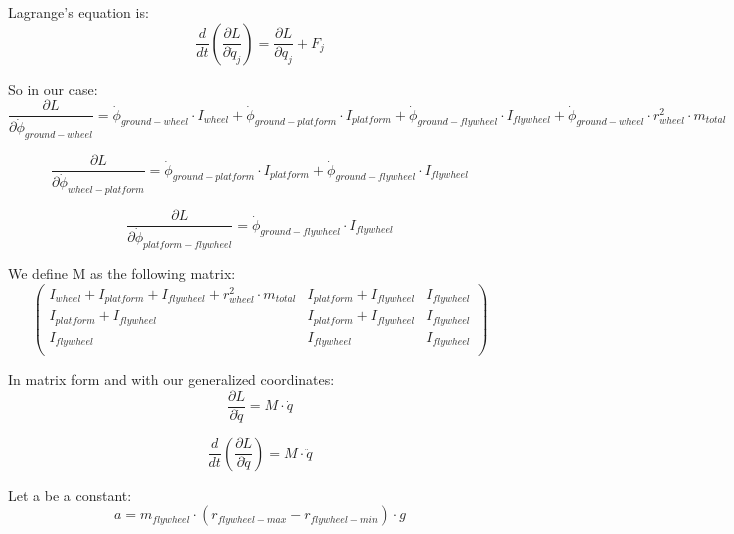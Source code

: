 Lagrange's equation is:
\begin{equation}
	\frac{d}{dt}(\frac{\partial L}{\partial \dot{q}_j})=
	\frac{\partial L}{\partial q_j}	+ F_{j}
\end{equation}

So in our case:
\begin{equation}
	\frac{\partial L}{\partial \dot{\phi}_{ground-wheel}}=
	\dot{\phi}_{ground-wheel} \cdot I_{wheel}
	+ \dot{\phi}_{ground-platform} \cdot I_{platform}
	+ \dot{\phi}_{ground-flywheel}\cdot I_{flywheel}
	+ \dot{\phi}_{ground-wheel}\cdot r_{wheel}^2\cdot m_{total}
\end{equation}

\begin{equation}
	\frac{\partial L}{\partial \dot{\phi}_{wheel-platform}}=
	\dot{\phi}_{ground-platform} \cdot I_{platform}
	+ \dot{\phi}_{ground-flywheel}\cdot I_{flywheel}
\end{equation}

\begin{equation}
	\frac{\partial L}{\partial \dot{\phi}_{platform-flywheel}}=
	\dot{\phi}_{ground-flywheel}\cdot I_{flywheel}
\end{equation}

We define M as the following matrix:
\begin{equation}
	\begin{pmatrix} 
		I_{wheel} + I_{platform} + I_{flywheel} + r_{wheel}^2 \cdot m_{total} &
		I_{platform} + I_{flywheel} &
		I_{flywheel}\\
		I_{platform} + I_{flywheel} &
		I_{platform} + I_{flywheel} &
		I_{flywheel}\\
		I_{flywheel} &
		I_{flywheel} &
		I_{flywheel}\\
		\end{pmatrix}
\end{equation}

In matrix form and with our generalized coordinates:
\begin{equation}
	\frac{\partial L}{\partial \dot{q}} =
	M \cdot \dot{q}
\end{equation}

\begin{equation}
	\frac{d}{dt}(\frac{\partial L}{\partial \dot{q}}) = 	M \cdot \ddot{q}	
\end{equation}

Let a be a constant:
\begin{equation}
	a = m_{flywheel}\cdot (r_{flywheel-max}-r_{flywheel-min}) \cdot g	
\end{equation}


